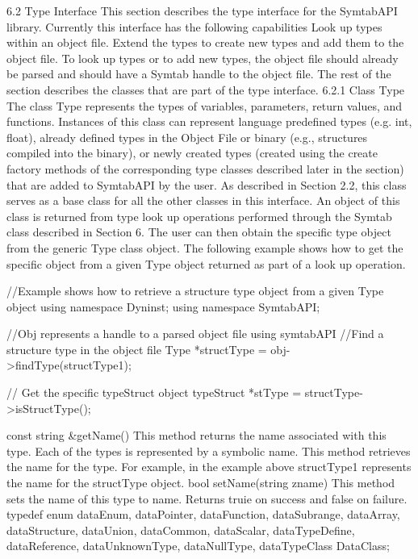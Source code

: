 6.2 Type Interface
This section describes the type interface for the SymtabAPI library. Currently this interface has the following capabilities
Look up types within an object file.
Extend the types to create new types and add them to the object file.
To look up types or to add new types, the object file should already be parsed and should have a Symtab handle to the object file. The rest of the section describes the classes that are part of the type interface.
6.2.1 Class Type
The class Type represents the types of variables, parameters, return values, and functions. Instances of this class can represent language predefined types (e.g. int, float), already defined types in the Object File or binary (e.g., structures compiled into the binary), or newly created types (created using the create factory methods of the corresponding type classes described later in the section) that are added to SymtabAPI by the user. 
As described in Section 2.2, this class serves as a base class for all the other classes in this interface. An object of this class is returned from type look up operations performed through the Symtab class described in Section 6. The user can then obtain the specific type object from the generic Type class object. The following example shows how to get the specific object from a given Type object returned as part of a look up operation.

//Example shows how to retrieve a structure type object from a given Type object
using namespace Dyninst;
using namespace SymtabAPI;

//Obj represents a handle to a parsed object file using symtabAPI
//Find a structure type in the object file
Type *structType = obj->findType(structType1);

// Get the specific typeStruct object
typeStruct *stType = structType->isStructType();

const string &getName()
This method returns the name associated with this type.
Each of the types is represented by a symbolic name. This method retrieves the name for the type. For example, in the example above structType1 represents the name for the structType object.
bool setName(string zname)
This method sets the name of this type to name. Returns truie on success and false on failure.
typedef enum{ 
dataEnum,
dataPointer,
dataFunction,
dataSubrange,
dataArray,
dataStructure,
dataUnion,
dataCommon,
dataScalar,
dataTypeDefine,
dataReference,
dataUnknownType,
dataNullType,
dataTypeClass
} DataClass;

